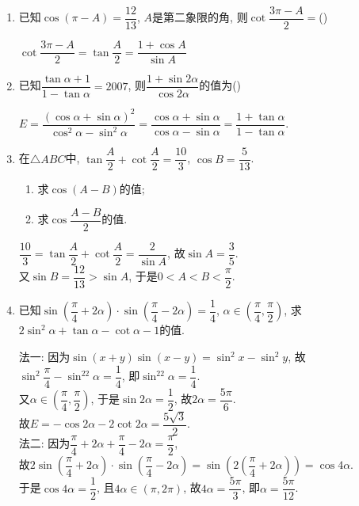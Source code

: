 \begin{enumerate}
\item 已知$\cos(\pi-A)=\dfrac{12}{13}$, $A$是第二象限的角, 则$\cot\dfrac{3\pi-A}{2}=$\dotfill()
\begin{jieda}
$\cot\dfrac{3\pi-A}{2}=\tan\dfrac{A}{2}=\dfrac{1+\cos{A}}{\sin{A}}$
\end{jieda}

\item 已知$\dfrac{\tan\alpha+1}{1-\tan\alpha}=2007$, 则$\dfrac{1+\sin2\alpha}{\cos2\alpha}$的值为\dotfill()
\begin{jieda}
$E=\dfrac{(\cos\alpha+\sin\alpha)^2}{\cos^2\alpha-\sin^2\alpha}=\dfrac{\cos\alpha+\sin\alpha}{\cos\alpha-\sin\alpha}=\dfrac{1+\tan\alpha}{1-\tan\alpha}$. 
\end{jieda}

\item 在$\triangle{ABC}$中, $\tan\dfrac{A}{2}+\cot\dfrac{A}{2}=\dfrac{10}{3}$, $\cos{B}=\dfrac{5}{13}$. 
\begin{enumerate}[(1)]
\item 求$\cos(A-B)$的值; 
\item 求$\cos\dfrac{A-B}{2}$的值. 
\end{enumerate}
\begin{jieda}
$\dfrac{10}{3}=\tan\dfrac{A}{2}+\cot\dfrac{A}{2}=\dfrac{2}{\sin{A}}$, 故$\sin{A}=\dfrac{3}{5}$. \\
又$\sin{B}=\dfrac{12}{13}>\sin{A}$, 于是$0<A<B<\dfrac{\pi}{2}$. \\
\end{jieda}

\item 已知$\sin\left(\dfrac{\pi}{4}+2\alpha\right)\cdot\sin\left(\dfrac{\pi}{4}-2\alpha\right)=\dfrac{1}{4}$, $\alpha\in\left(\dfrac{\pi}{4},\dfrac{\pi}{2}\right)$, 
求$2\sin^2\alpha+\tan\alpha-\cot\alpha-1$的值. 
\begin{jieda}
法一: 因为$\sin(x+y)\sin(x-y)=\sin^2x-\sin^2y$, 
故$\sin^2\dfrac{\pi}{4}-\sin^22\alpha=\dfrac{1}{4}$, 即$\sin^22\alpha=\dfrac{1}{4}$. \\
又$\alpha\in\left(\dfrac{\pi}{4},\dfrac{\pi}{2}\right)$, 于是$\sin2\alpha=\dfrac{1}{2}$, 故$2\alpha=\dfrac{5\pi}{6}$. \\
故$E=-\cos2\alpha-2\cot2\alpha=\dfrac{5\sqrt{3}}{2}$. \\
法二: 因为$\dfrac{\pi}{4}+2\alpha+\dfrac{\pi}{4}-2\alpha=\dfrac{\pi}{2}$, \\
故$2\sin\left(\dfrac{\pi}{4}+2\alpha\right)\cdot\sin\left(\dfrac{\pi}{4}-2\alpha\right)=\sin\left(2\left(\dfrac{\pi}{4}+2\alpha\right)\right)=\cos4\alpha$. \\
于是$\cos4\alpha=\dfrac{1}{2}$, 且$4\alpha\in\left(\pi,2\pi\right)$, 故$4\alpha=\dfrac{5\pi}{3}$, 即$\alpha=\dfrac{5\pi}{12}$. 
\end{jieda}


\end{enumerate}
